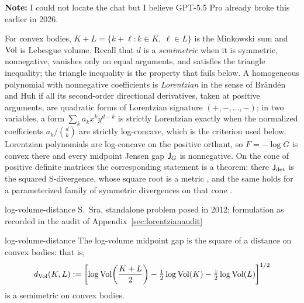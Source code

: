 

\begin{cxcredits}
\end{cxcredits}

\begin{cxcontext}
\noindent\textbf{Note:} I could not locate the chat but I believe GPT-5.5 Pro already broke this earlier in 2026.
\vskip 8pt
  
For convex bodies, $K+L=\{k+\ell:k\in K,\ \ell\in L\}$ is the Minkowski sum and $\operatorname{Vol}$ is Lebesgue volume.  Recall that $d$ is a \emph{semimetric} when it is symmetric, nonnegative, vanishes only on equal arguments, and satisfies the triangle inequality; the triangle inequality is the property that fails below.  A homogeneous polynomial with nonnegative coefficients is \emph{Lorentzian} in the sense of Br\"and\'en and Huh \citeyearpar{BrandenHuh} if all its second-order directional derivatives, taken at positive arguments, are quadratic forms of Lorentzian signature $(+,-,\ldots,-)$; in two variables, a form $\sum_{k}a_kx^ky^{d-k}$ is strictly Lorentzian exactly when the normalized coefficients $a_k/\binom dk$ are strictly log-concave, which is the criterion used below.  Lorentzian polynomials are log-concave on the positive orthant, so $F=-\log G$ is convex there and every midpoint Jensen gap $\mathsf{J}_G$ is nonnegative.  On the cone of positive definite matrices the corresponding statement is a theorem: there $\mathsf{J}_{\det}$ is the squared S-divergence, whose square root is a metric \citep{SraSdiv}, and the same holds for a parameterized family of symmetric divergences on that cone \citep{SraJSMetrics2021}.
\end{cxcontext}


\begin{cxsource}{log-volume-distance}
S.~Sra, standalone problem posed in 2012; formulation as recorded in the audit of Appendix~\ref{sec:lorentzianaudit}
\end{cxsource}

\begin{cxstatement}{log-volume-distance}
The log-volume midpoint gap is the square of a distance on convex bodies: that is,
\[d_{\operatorname{Vol}}(K,L):=\left[\log\operatorname{Vol}\!\left(\frac{K+L}{2}\right)-\tfrac12\log\operatorname{Vol}(K)-\tfrac12\log\operatorname{Vol}(L)\right]^{1/2}\]
is a semimetric on convex bodies.
\end{cxstatement}

